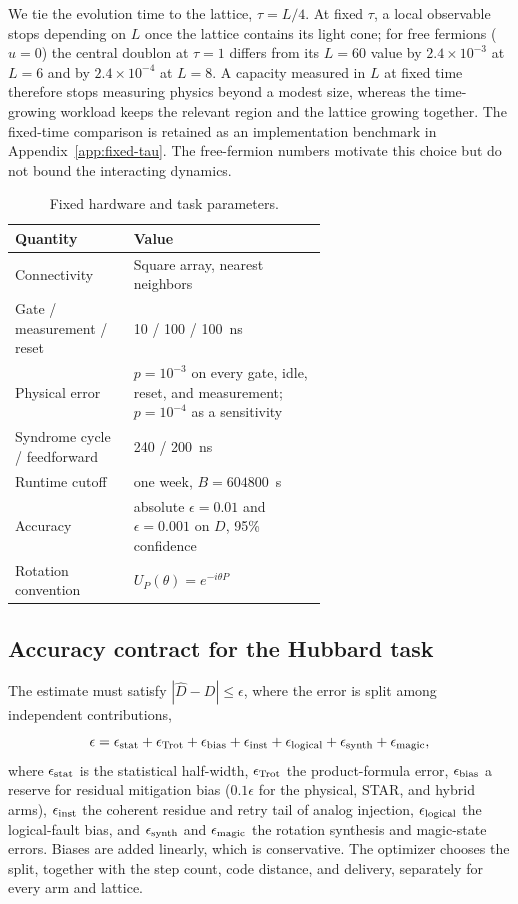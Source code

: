 \documentclass[11pt]{article}
\newcommand{\eps}{\epsilon}
\begin{document}
We tie the evolution time to the lattice, $\tau=L/4$. At fixed $\tau$, a local
observable stops depending on $L$ once the lattice contains its light cone;
for free fermions ($u=0$) the central doublon at $\tau=1$ differs from its
$L=60$ value by $2.4\times10^{-3}$ at $L=6$ and by $2.4\times10^{-4}$ at $L=8$.
A capacity measured in $L$ at fixed time therefore stops measuring physics
beyond a modest size, whereas the time-growing workload keeps the relevant
region and the lattice growing together. The fixed-time comparison is retained
as an implementation benchmark in Appendix~\ref{app:fixed-tau}. The free-fermion
numbers motivate this choice but do not bound the interacting dynamics.

\begin{table}[!htbp]
\centering
\small
\begin{tabular}{@{}lp{0.62\linewidth}@{}}
\toprule
Quantity & Value\\
\midrule
Connectivity & Square array, nearest neighbors\\
Gate / measurement / reset & 10 / 100 / 100~ns\\
Physical error & $p=10^{-3}$ on every gate, idle, reset, and measurement; $p=10^{-4}$ as a sensitivity\\
Syndrome cycle / feedforward & 240 / 200~ns\\
Runtime cutoff & one week, $B=604800$~s\\
Accuracy & absolute $\eps=0.01$ and $\eps=0.001$ on $D$, 95\% confidence\\
Rotation convention & $U_P(\theta)=e^{-i\theta P}$\\
\bottomrule
\end{tabular}
\caption{Fixed hardware and task parameters.}\label{tab:parameters}
\end{table}

\subsection{Accuracy contract for the Hubbard task}
The estimate must satisfy $|\widehat D-D|\leq\eps$, where the error is split
among independent contributions,
\begin{equation}\label{eq:budget}
 \eps=\eps_{\rm stat}+\eps_{\rm Trot}+\eps_{\rm bias}+\eps_{\rm inst}
 +\eps_{\rm logical}+\eps_{\rm synth}+\eps_{\rm magic},
\end{equation}
where $\eps_{\rm stat}$ is the statistical half-width, $\eps_{\rm Trot}$ the
product-formula error, $\eps_{\rm bias}$ a reserve for residual mitigation
bias ($0.1\eps$ for the physical, STAR, and hybrid arms), $\eps_{\rm inst}$ the coherent
residue and retry tail of analog injection, $\eps_{\rm logical}$ the
logical-fault bias, and $\eps_{\rm synth}$ and $\eps_{\rm magic}$ the rotation
synthesis and magic-state errors. Biases are added linearly, which is
conservative. The optimizer chooses the split, together with the step count,
code distance, and delivery, separately for every arm and lattice.
\end{document}
